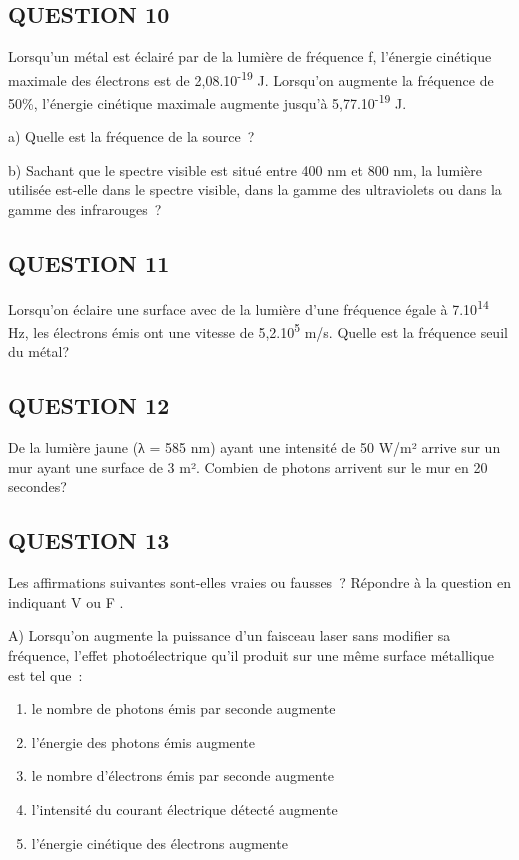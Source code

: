 {\subsection{QUESTION 10}

Lorsqu'un métal est éclairé par de la lumière de fréquence f, l'énergie
cinétique maximale des électrons est de 2,08.10\textsuperscript{-19} J.
Lorsqu'on augmente la fréquence de 50\%, l'énergie cinétique maximale
augmente jusqu'à 5,77.10\textsuperscript{-19} J.

a) Quelle est la fréquence de la source~?

b) Sachant que le spectre visible est situé entre 400 nm et 800 nm, la
lumière utilisée est-elle dans le spectre visible, dans la gamme des
ultraviolets ou dans la gamme des infrarouges~?

\subsection{QUESTION 11}

Lorsqu'on éclaire une surface avec de la lumière d'une fréquence égale à
7.10\textsuperscript{14 }Hz, les électrons émis ont une vitesse de
5,2.10\textsuperscript{5} m/s. Quelle est la fréquence seuil du métal?

\subsection{QUESTION 12}

De la lumière jaune (λ = 585 nm) ayant une intensité de 50 W/m² arrive
sur un mur ayant une surface de 3 m². Combien de photons arrivent sur le
mur en 20 secondes?

\subsection{QUESTION 13}

Les affirmations suivantes sont-elles vraies ou fausses~? Répondre à la
question en indiquant V ou F .

A) Lorsqu'on augmente la puissance d'un faisceau laser sans modifier sa
fréquence, l'effet photoélectrique qu'il produit sur une même surface
métallique est tel que~:
\begin{enumerate}
\item  le nombre de photons émis par seconde augmente
\item  l'énergie des photons émis augmente
\item  le nombre d'électrons émis par seconde augmente
\item  l'intensité du courant électrique détecté augmente
\item  l'énergie cinétique des électrons augmente
\end{enumerate}

}
